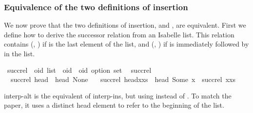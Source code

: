 \subsubsection{Equivalence of the two definitions of insertion}\label{sec:insert-alt-equiv}

We now prove that the two definitions of insertion,  and , are equivalent.
First we define how to derive the successor relation from an Isabelle list.
This relation contains (, ) if  is the last element of the list, and (, ) if  is immediately followed by  in the list.

\begin{isabelle}
\isamarkupfalse%
\ succ{\isacharunderscore}rel\ {\isacharcolon}{\isacharcolon}\ {\isachardoublequoteopen}{\isacharprime}oid\ list\ {\isasymRightarrow}\ {\isacharparenleft}{\isacharprime}oid\ {\isasymtimes}\ {\isacharprime}oid\ option{\isacharparenright}\ set{\isachardoublequoteclose}\isanewline
{}\isanewline
\ \ {\isachardoublequoteopen}succ{\isacharunderscore}rel\ {\isacharbrackleft}{\isacharbrackright}\ {\isacharequal}\ {\isacharbraceleft}{\isacharbraceright}{\isachardoublequoteclose}\ {\isacharbar}\isanewline
\ \ {\isachardoublequoteopen}succ{\isacharunderscore}rel\ {\isacharbrackleft}head{\isacharbrackright}\ {\isacharequal}\ {\isacharbraceleft}{\isacharparenleft}head{\isacharcomma}\ None{\isacharparenright}{\isacharbraceright}{\isachardoublequoteclose}\ {\isacharbar}\isanewline
\ \ {\isachardoublequoteopen}succ{\isacharunderscore}rel\ {\isacharparenleft}head{\isacharhash}x{\isacharhash}xs{\isacharparenright}\ {\isacharequal}\ {\isacharbraceleft}{\isacharparenleft}head{\isacharcomma}\ Some\ x{\isacharparenright}{\isacharbraceright}\ {\isasymunion}\ succ{\isacharunderscore}rel\ {\isacharparenleft}x{\isacharhash}xs{\isacharparenright}{\isachardoublequoteclose}%
\end{isabelle}

\noindent
interp-alt is the equivalent of interp-ins, but using  instead of .
To match the paper, it uses a distinct head element to refer to the beginning of the list.

